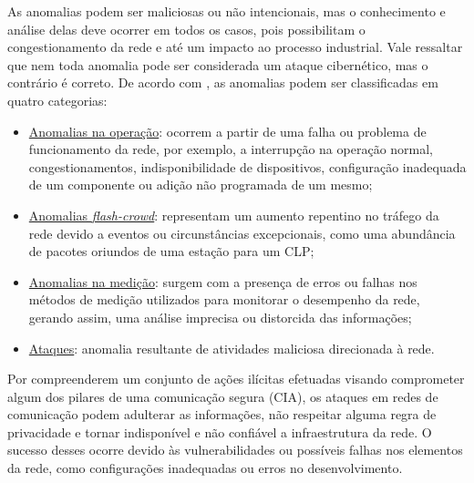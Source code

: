     As anomalias podem ser maliciosas ou não intencionais, mas o conhecimento e análise delas deve ocorrer em todos os casos, pois possibilitam o congestionamento da rede e até um impacto ao processo industrial. Vale ressaltar que nem toda anomalia pode ser considerada um ataque cibernético, mas o contrário é correto. De acordo com \cite{barford2002}, as anomalias podem ser classificadas em quatro categorias:

    \begin{itemize}
        \item \underline{Anomalias na operação}: ocorrem a partir de uma falha ou problema de funcionamento da rede, por exemplo, a interrupção na operação normal, congestionamentos, indisponibilidade de dispositivos, configuração inadequada de um componente ou adição não programada de um mesmo; 
        \item \underline{Anomalias \textit{flash-crowd}}: representam um aumento repentino no tráfego da rede devido a eventos ou circunstâncias excepcionais, como uma abundância de pacotes oriundos de uma estação para um CLP;
        \item \underline{Anomalias na medição}: surgem com a presença de erros ou falhas nos métodos de medição utilizados para monitorar o desempenho da rede, gerando assim, uma análise imprecisa ou distorcida das informações;
        \item \underline{Ataques}: anomalia resultante de atividades maliciosa direcionada à rede.
    \end{itemize}


    Por compreenderem um conjunto de ações ilícitas efetuadas visando comprometer algum dos pilares de uma comunicação segura (CIA), os ataques em redes de comunicação podem adulterar as informações, não respeitar alguma regra de privacidade e tornar indisponível e não confiável a infraestrutura da rede. O sucesso desses ocorre devido às vulnerabilidades ou possíveis falhas nos elementos da rede, como configurações inadequadas ou erros no desenvolvimento.

